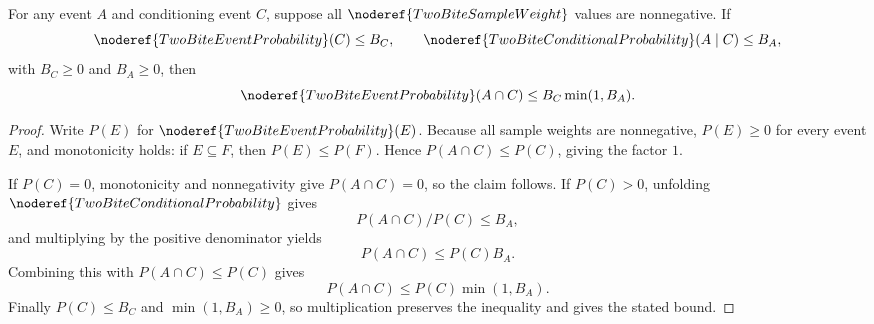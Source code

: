 \begin{helper}
For any event \(A\) and conditioning event \(C\), suppose all
\(\noderef{TwoBiteSampleWeight}\) values are nonnegative.  If
\[
\noderef{TwoBiteEventProbability}(C)\le B_C,\qquad
\noderef{TwoBiteConditionalProbability}(A\mid C)\le B_A,
\]
with \(B_C\ge0\) and \(B_A\ge0\), then
\[
\noderef{TwoBiteEventProbability}(A\cap C)\le
B_C\min(1,B_A).
\]
\end{helper}
\begin{proof}
Write \(P(E)\) for \(\noderef{TwoBiteEventProbability}(E)\).  Because all
sample weights are nonnegative, \(P(E)\ge0\) for every event \(E\), and
monotonicity holds: if \(E\subseteq F\), then \(P(E)\le P(F)\).  Hence
\(P(A\cap C)\le P(C)\), giving the factor \(1\).

If \(P(C)=0\), monotonicity and nonnegativity give \(P(A\cap C)=0\), so the
claim follows.  If \(P(C)>0\), unfolding
\(\noderef{TwoBiteConditionalProbability}\) gives
\[
P(A\cap C)/P(C)\le B_A,
\]
and multiplying by the positive denominator yields
\[
P(A\cap C)\le P(C)B_A.
\]
Combining this with \(P(A\cap C)\le P(C)\) gives
\[
P(A\cap C)\le P(C)\min(1,B_A).
\]
Finally \(P(C)\le B_C\) and \(\min(1,B_A)\ge0\), so multiplication preserves
the inequality and gives the stated bound.
\end{proof}
